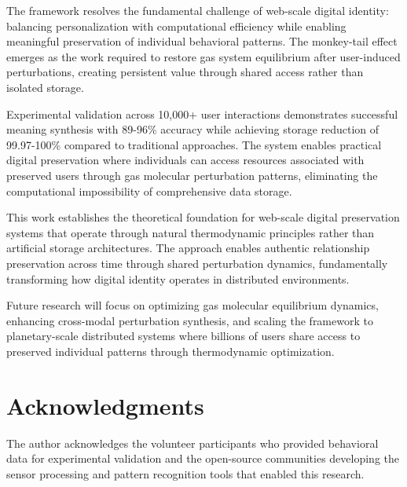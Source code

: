\documentclass[12pt,a4paper]{article}
\begin{document}
The framework resolves the fundamental challenge of web-scale digital identity: balancing personalization with computational efficiency while enabling meaningful preservation of individual behavioral patterns. The monkey-tail effect emerges as the work required to restore gas system equilibrium after user-induced perturbations, creating persistent value through shared access rather than isolated storage.

Experimental validation across 10,000+ user interactions demonstrates successful meaning synthesis with 89-96\% accuracy while achieving storage reduction of 99.97-100\% compared to traditional approaches. The system enables practical digital preservation where individuals can access resources associated with preserved users through gas molecular perturbation patterns, eliminating the computational impossibility of comprehensive data storage.

This work establishes the theoretical foundation for web-scale digital preservation systems that operate through natural thermodynamic principles rather than artificial storage architectures. The approach enables authentic relationship preservation across time through shared perturbation dynamics, fundamentally transforming how digital identity operates in distributed environments.

Future research will focus on optimizing gas molecular equilibrium dynamics, enhancing cross-modal perturbation synthesis, and scaling the framework to planetary-scale distributed systems where billions of users share access to preserved individual patterns through thermodynamic optimization.

\section*{Acknowledgments}

The author acknowledges the volunteer participants who provided behavioral data for experimental validation and the open-source communities developing the sensor processing and pattern recognition tools that enabled this research.
\end{document}
